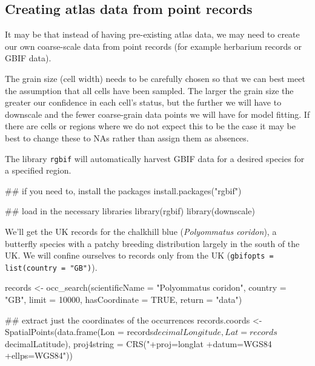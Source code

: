 \documentclass{article}[12pt, a4paper]
\begin{document}
\newpage
\subsection{Creating atlas data from point records}

It may be that instead of having pre-existing atlas data, we may need to create our own coarse-scale data from point records (for example herbarium records or GBIF data).

The grain size (cell width) needs to be carefully chosen so that we can best meet the assumption that all cells have been sampled. The larger the grain size the greater our confidence in each cell's status, but the further we will have to downscale and the fewer coarse-grain data points we will have for model fitting. If there are cells or regions where we do not expect this to be the case it may be best to change these to NAs rather than assign them as absences.

The library \texttt{rgbif} will automatically harvest GBIF data for a desired species for a specified region.

\begin{Schunk}
\begin{Sinput}
## if you need to, install the packages
install.packages("rgbif")

## load in the necessary libraries
library(rgbif)
library(downscale)
\end{Sinput}
\end{Schunk}

We’ll get the UK records for the chalkhill blue (\emph{Polyommatus coridon}), a butterfly species with a patchy breeding distribution largely in the south of the UK. We will confine ourselves to records only from the UK (\texttt{gbifopts = list(country = "GB")}).

\begin{Schunk}
\begin{Sinput}
records <- occ_search(scientificName = "Polyommatus coridon",
                      country = "GB",
                      limit = 10000,
                      hasCoordinate = TRUE,
                      return = "data")
               
## extract just the coordinates of the occurrences
records.coords <- SpatialPoints(data.frame(Lon = records$decimalLongitude,
                                           Lat = records$decimalLatitude), 
                                proj4string = CRS("+proj=longlat +datum=WGS84
                                                   +ellps=WGS84"))
\end{Sinput}
\end{Schunk}
\end{document}
